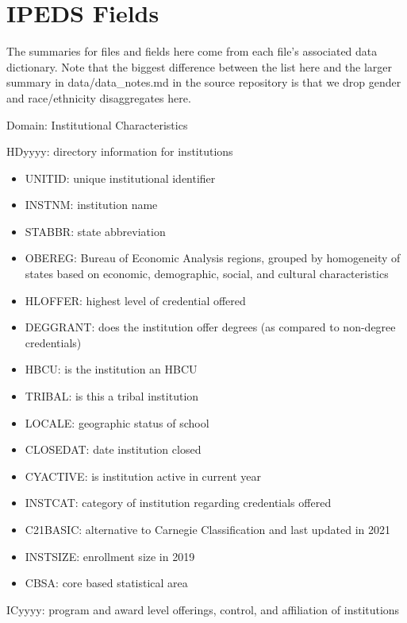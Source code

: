 \documentclass[sigconf, authorversion, nonacm]{acmart}
\begin{document}



\appendix

\section{IPEDS Fields}
    The summaries for files and fields here come from each file's associated data dictionary. Note that the biggest difference between the list here and the larger summary in data/data_notes.md in the source repository is that we drop gender and race/ethnicity disaggregates here.

    Domain: Institutional Characteristics

    HDyyyy: directory information for institutions

    \begin{itemize}
        \item UNITID: unique institutional identifier
        \item INSTNM: institution name
        \item STABBR: state abbreviation
        \item OBEREG: Bureau of Economic Analysis regions, grouped by homogeneity of states based on economic, demographic, social, and cultural characteristics
        \item HLOFFER: highest level of credential offered
        \item DEGGRANT: does the institution offer degrees (as compared to non-degree credentials)
        \item HBCU: is the institution an HBCU
        \item TRIBAL: is this a tribal institution
        \item LOCALE: geographic status of school
        \item CLOSEDAT: date institution closed
        \item CYACTIVE: is institution active in current year
        \item INSTCAT: category of institution regarding credentials offered
        \item C21BASIC: alternative to Carnegie Classification and last updated in 2021
        \item INSTSIZE: enrollment size in 2019
        \item CBSA: core based statistical area
    \end{itemize}

    ICyyyy: program and award level offerings, control, and affiliation of institutions
\end{document}
